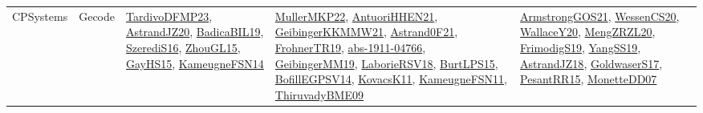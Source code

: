 {\begin{longtable}{lp{3cm}>{\raggedright}p{6cm}>{\raggedright}p{6cm}p{8cm}}
CPSystems & Gecode & \href{papers/TardivoDFMP23.pdf}{TardivoDFMP23}\cite{TardivoDFMP23}, \href{articles/AstrandJZ20.pdf}{AstrandJZ20}\cite{AstrandJZ20}, \href{papers/BadicaBIL19.pdf}{BadicaBIL19}\cite{BadicaBIL19}, \href{papers/SzerediS16.pdf}{SzerediS16}\cite{SzerediS16}, \href{papers/ZhouGL15.pdf}{ZhouGL15}\cite{ZhouGL15}, \href{papers/GayHS15.pdf}{GayHS15}\cite{GayHS15}, \href{articles/KameugneFSN14.pdf}{KameugneFSN14}\cite{KameugneFSN14} & \href{articles/MullerMKP22.pdf}{MullerMKP22}\cite{MullerMKP22}, \href{papers/AntuoriHHEN21.pdf}{AntuoriHHEN21}\cite{AntuoriHHEN21}, \href{papers/GeibingerKKMMW21.pdf}{GeibingerKKMMW21}\cite{GeibingerKKMMW21}, \href{papers/Astrand0F21.pdf}{Astrand0F21}\cite{Astrand0F21}, \href{papers/FrohnerTR19.pdf}{FrohnerTR19}\cite{FrohnerTR19}, \href{articles/abs-1911-04766.pdf}{abs-1911-04766}\cite{abs-1911-04766}, \href{papers/GeibingerMM19.pdf}{GeibingerMM19}\cite{GeibingerMM19}, \href{articles/LaborieRSV18.pdf}{LaborieRSV18}\cite{LaborieRSV18}, \href{papers/BurtLPS15.pdf}{BurtLPS15}\cite{BurtLPS15}, \href{papers/BofillEGPSV14.pdf}{BofillEGPSV14}\cite{BofillEGPSV14}, \href{articles/KovacsK11.pdf}{KovacsK11}\cite{KovacsK11}, \href{papers/KameugneFSN11.pdf}{KameugneFSN11}\cite{KameugneFSN11}, \href{papers/ThiruvadyBME09.pdf}{ThiruvadyBME09}\cite{ThiruvadyBME09} & \href{papers/ArmstrongGOS21.pdf}{ArmstrongGOS21}\cite{ArmstrongGOS21}, \href{papers/WessenCS20.pdf}{WessenCS20}\cite{WessenCS20}, \href{articles/WallaceY20.pdf}{WallaceY20}\cite{WallaceY20}, \href{articles/MengZRZL20.pdf}{MengZRZL20}\cite{MengZRZL20}, \href{papers/FrimodigS19.pdf}{FrimodigS19}\cite{FrimodigS19}, \href{papers/YangSS19.pdf}{YangSS19}\cite{YangSS19}, \href{papers/AstrandJZ18.pdf}{AstrandJZ18}\cite{AstrandJZ18}, \href{papers/GoldwaserS17.pdf}{GoldwaserS17}\cite{GoldwaserS17}, \href{papers/PesantRR15.pdf}{PesantRR15}\cite{PesantRR15}, \href{papers/MonetteDD07.pdf}{MonetteDD07}\cite{MonetteDD07}\\

\end{longtable}}
